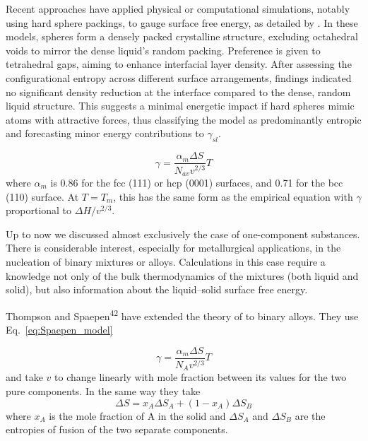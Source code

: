 Recent approaches have applied physical or computational simulations, notably using hard sphere packings, to gauge surface free energy, 
as detailed by \cite{Spaepen1975ASM}. In these models, spheres form a densely packed crystalline structure, excluding octahedral voids 
to mirror the dense liquid's random packing. Preference is given to tetrahedral gaps, aiming to enhance interfacial layer density. After 
assessing the configurational entropy across different surface arrangements, findings indicated no significant density reduction at the 
interface compared to the dense, random liquid structure. This suggests a minimal energetic impact if hard spheres mimic atoms with attractive forces, 
thus classifying the model as predominantly entropic and forecasting minor energy contributions to $\gamma_{sl}$.

\begin{equation} \label{eq:Spaepen_model}
\gamma = \frac{\alpha_m \Delta S}{N_{av} v^{2/3}} T
\end{equation}
where $\alpha_m$ is 0.86 for the fcc (111) or hcp (0001) surfaces, and 0.71 for the bcc (110) surface. At $T = T_m$, this has the same form as 
the empirical equation with $\gamma$ proportional to $\Delta H/v^{2/3}$.

Up to now we discussed almost exclusively the case of one-component substances. There is considerable interest, 
especially for metallurgical applications, in the nucleation of binary mixtures or alloys. Calculations in this case 
require a knowledge not only of the bulk thermodynamics of the mixtures (both liquid and solid), but also information about the liquid--solid surface free energy.

Thompson and Spaepen\textsuperscript{42} have extended the theory of \cite{Spaepen1975ASM} to binary alloys. They use Eq.~\ref{eq:Spaepen_model}

\begin{equation} \label{eq:Thompson_Spaepen_model}
\gamma = \frac{\alpha_m \Delta S}{N_{A} v^{2/3}} T
\end{equation}
and take $v$ to change linearly with mole fraction between its values for the two pure components. In the same way they take
\begin{equation} \label{eq:Delta_S}
\Delta S = x_A \Delta S_A + (1 - x_A) \Delta S_B
\end{equation}
where $x_A$ is the mole fraction of A in the solid and $\Delta S_A$ and $\Delta S_B$ are the entropies of fusion of the two separate components.


